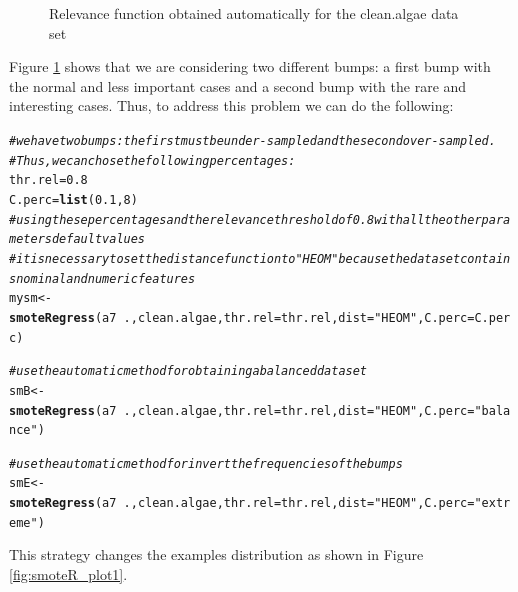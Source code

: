 \documentclass[10pt,a4paper]{article}\usepackage[]{graphicx}\usepackage[]{color}
\makeatletter
\newcommand{\hlnum}[1]{\textcolor[rgb]{0.686,0.059,0.569}{#1}}%
\newcommand{\hlstr}[1]{\textcolor[rgb]{0.192,0.494,0.8}{#1}}%
\newcommand{\hlcom}[1]{\textcolor[rgb]{0.678,0.584,0.686}{\textit{#1}}}%
\newcommand{\hlopt}[1]{\textcolor[rgb]{0,0,0}{#1}}%
\newcommand{\hlstd}[1]{\textcolor[rgb]{0.345,0.345,0.345}{#1}}%
\newcommand{\hlkwb}[1]{\textcolor[rgb]{0.69,0.353,0.396}{#1}}%
\newcommand{\hlkwc}[1]{\textcolor[rgb]{0.333,0.667,0.333}{#1}}%
\newcommand{\hlkwd}[1]{\textcolor[rgb]{0.737,0.353,0.396}{\textbf{#1}}}%
\newenvironment{kframe}{%
 \def\at@end@of@kframe{}%
 \ifinner\ifhmode%
  \def\at@end@of@kframe{\end{minipage}}%
  \begin{minipage}{\columnwidth}%
 \fi\fi%
 \def\FrameCommand##1{\hskip\@totalleftmargin \hskip-\fboxsep
 \colorbox{shadecolor}{##1}\hskip-\fboxsep
     \hskip-\linewidth \hskip-\@totalleftmargin \hskip\columnwidth}%
 \MakeFramed {\advance\hsize-\width
   \@totalleftmargin\z@ \linewidth\hsize
   \@setminipage}}%
 {\par\unskip\endMakeFramed%
 \at@end@of@kframe}
\newenvironment{knitrout}{}{} %
\makeatother
\begin{document}
\begin{knitrout}
\begin{figure}
{}

\caption[Relevance function obtained automatically for the clean]{Relevance function obtained automatically for the clean.algae data set}\label{fig:smoteR_rel1}
\end{figure}


\end{knitrout}

Figure \ref{fig:smoteR_rel1} shows that we are considering two different bumps: a first bump with the normal and less important cases and a second bump with the rare and interesting cases. Thus, to address this problem we can do the following:

\begin{knitrout}\footnotesize
{}\color{fgcolor}\begin{kframe}
\begin{alltt}
\hlcom{# we have two bumps: the first must be under-sampled and the second over-sampled. }
\hlcom{# Thus, we can chose the following percentages: }
\hlstd{thr.rel}\hlkwb{=}\hlnum{0.8}
\hlstd{C.perc}\hlkwb{=}\hlkwd{list}\hlstd{(}\hlnum{0.1}\hlstd{,} \hlnum{8}\hlstd{)}
\hlcom{# using these percentages and the relevance threshold of 0.8 with all the other parameters default values}
\hlcom{# it is necessary to set the distance function to "HEOM" because the data set contains nominal and numeric features}
\hlstd{mysm} \hlkwb{<-} \hlkwd{smoteRegress}\hlstd{(a7}\hlopt{~}\hlstd{., clean.algae,} \hlkwc{thr.rel}\hlstd{=thr.rel,} \hlkwc{dist}\hlstd{=}\hlstr{"HEOM"}\hlstd{,} \hlkwc{C.perc}\hlstd{=C.perc)}

\hlcom{# use the automatic method for obtaining a balanced data set}
\hlstd{smB} \hlkwb{<-} \hlkwd{smoteRegress}\hlstd{(a7}\hlopt{~}\hlstd{., clean.algae,} \hlkwc{thr.rel}\hlstd{=thr.rel,} \hlkwc{dist}\hlstd{=}\hlstr{"HEOM"}\hlstd{,} \hlkwc{C.perc}\hlstd{=}\hlstr{"balance"}\hlstd{)}

\hlcom{# use the automatic method for invert the frequencies of the bumps}
\hlstd{smE} \hlkwb{<-} \hlkwd{smoteRegress}\hlstd{(a7}\hlopt{~}\hlstd{., clean.algae,} \hlkwc{thr.rel}\hlstd{=thr.rel,} \hlkwc{dist}\hlstd{=}\hlstr{"HEOM"}\hlstd{,} \hlkwc{C.perc}\hlstd{=}\hlstr{"extreme"}\hlstd{)}
\end{alltt}
\end{kframe}
\end{knitrout}

This strategy changes the examples distribution as shown in Figure \ref{fig:smoteR_plot1}.
\end{document}

